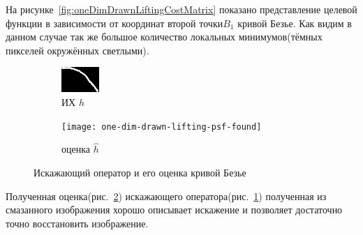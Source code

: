 На рисунке~\ref{fig:oneDimDrawnLiftingCostMatrix} показано представление целевой функции в зависимости от координат второй точки$B_1$ кривой Безье. Как видим в данном случае так же большое количество локальных минимумов(тёмных пикселей окружённых светлыми).

\begin{figure}[h!]
	\centering
	\begin{subfigure}[t]{0.475\textwidth}
		\centering
		\includegraphics[width=0.3\linewidth]{../input/drawn-psf3}
		\caption{ИХ $h$}
		\label{fig:drawnPsf3Orig}
	\end{subfigure}
	\begin{subfigure}[t]{0.15\textwidth}
		\centering
		\texttt{[image: one-dim-drawn-lifting-psf-found]}
		\caption{оценка $\hat{h}$}
		\label{fig:drawnPsf3Estimation}
		
	\end{subfigure}
	\caption{Искажающий оператор и его оценка кривой Безье}
	\label{fig:drawnPsf3Est}
\end{figure}

Полученная оценка(рис.~\ref{fig:drawnPsf3Estimation}) искажающего оператора(рис.~\ref{fig:drawnPsf3Orig}) полученная из смазанного изображения хорошо описывает искажение и позволяет достаточно точно восстановить изображение.

